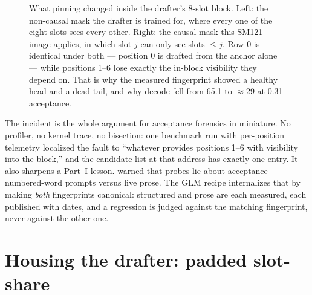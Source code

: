 \begin{figure}[htbp]
{}
\caption{What pinning  changed inside the
drafter's 8-slot block. Left: the non-causal mask the drafter is trained
for, where every one of the eight slots sees every other. Right: the causal
mask this SM121 image applies, in which slot $j$ can only see slots
$\leq j$. Row 0 is identical under both --- position 0 is drafted from the
anchor alone --- while positions 1--6 lose exactly the in-block visibility
they depend on. That is why the measured fingerprint showed a healthy head
and a dead tail, and why decode fell from 65.1 to $\approx$29
\tokspersec{} at 0.31 acceptance.}
\label{fig:dflash2-mask}
\end{figure}

The incident is the whole argument for acceptance forensics in miniature.
No profiler, no kernel trace, no bisection: one benchmark run with
per-position telemetry localized the fault to ``whatever provides positions
1--6 with visibility into the block,'' and the candidate list at that
address has exactly one entry. It also sharpens a Part~I lesson.
 warned that probes lie about acceptance ---
numbered-word prompts versus live prose. The GLM recipe internalizes that by
making \emph{both} fingerprints canonical: structured and prose are each
measured, each published with dates, and a regression is judged against the
matching fingerprint, never against the other one.

\section{Housing the drafter: padded slot-share}
\label{sec:dflash2-slotshare}


